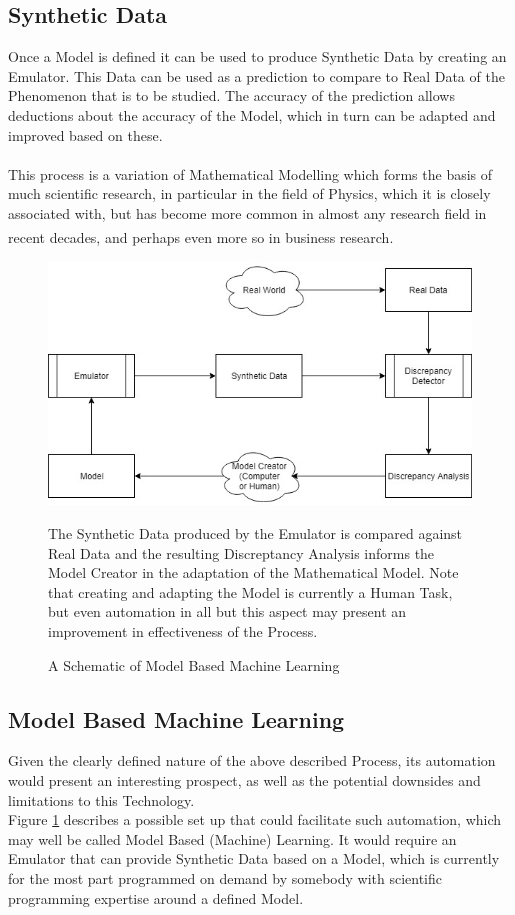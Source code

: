 \documentclass{article}
\begin{document}
  \subsection{Synthetic Data}
  
Once a Model is defined it can be used to produce Synthetic Data by creating an Emulator. This Data can be used as a prediction to compare to Real Data of the Phenomenon that is to be studied. The accuracy of the prediction allows deductions about the accuracy of the Model, which in turn can be adapted and improved based on these.
\\\\ This process is a variation of Mathematical Modelling which forms the basis of much scientific research, in particular in the field of Physics, which it is closely associated with, but has become more common in almost any research field in recent decades, and perhaps even more so in business research.   \textsuperscript{\cite{modelling}}

  \begin{figure}[h]
    \centering
    \includegraphics[width=0.7\linewidth]{figures/ModelLearning}
    \caption{A Schematic of Model Based Machine Learning}The Synthetic Data produced by the Emulator is compared against Real Data and the resulting Discreptancy Analysis informs the Model Creator in the adaptation of the Mathematical Model. Note that creating and adapting the Model is currently a Human Task, but even automation in all but this aspect may present an improvement in effectiveness of the Process.
    \label{fig:modelLearning}
\end{figure}
  
  \subsection{Model Based Machine Learning}
  
Given the clearly defined nature of the above described Process, its automation would present an interesting prospect, as well as the potential downsides and limitations to this Technology.
\\ Figure \ref{fig:modelLearning} describes a possible set up that could facilitate such automation, which may well be called Model Based (Machine) Learning. It would require an Emulator that can provide Synthetic Data based on a Model, which is currently for the most part programmed on demand by somebody with scientific programming expertise around a defined Model. 
\end{document}
